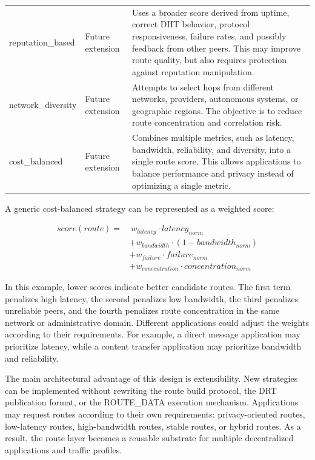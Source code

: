 \documentclass[12pt,a4paper]{article}
\newcommand{\codebreak}[1]{{\footnotesize\ttfamily #1}}
\begin{document}
\begin{table}[H]
\begin{tabularx}{\textwidth}{L{0.22\textwidth} L{0.18\textwidth} Y}
\codebreak{reputation\_\allowbreak{}based} &
Future extension &
Uses a broader score derived from uptime, correct DHT behavior, protocol responsiveness, failure rates, and possibly feedback from other peers. This may improve route quality, but also requires protection against reputation manipulation. \\

\codebreak{network\_\allowbreak{}diversity} &
Future extension &
Attempts to select hops from different networks, providers, autonomous systems, or geographic regions. The objective is to reduce route concentration and correlation risk. \\

\codebreak{cost\_\allowbreak{}balanced} &
Future extension &
Combines multiple metrics, such as latency, bandwidth, reliability, and diversity, into a single route score. This allows applications to balance performance and privacy instead of optimizing a single metric. \\

\bottomrule
\end{tabularx}
\end{table}

A generic cost-balanced strategy can be represented as a weighted score:

\begin{equation}
\begin{aligned}
score(route) =
&\ w_{latency} \cdot latency_{norm} \\
&+ w_{bandwidth} \cdot (1 - bandwidth_{norm}) \\
&+ w_{failure} \cdot failure_{norm} \\
&+ w_{concentration} \cdot concentration_{norm}
\end{aligned}
\end{equation}

In this example, lower scores indicate better candidate routes. The first term penalizes high latency, the second penalizes low bandwidth, the third penalizes unreliable peers, and the fourth penalizes route concentration in the same network or administrative domain. Different applications could adjust the weights according to their requirements. For example, a direct message application may prioritize latency, while a content transfer application may prioritize bandwidth and reliability.

The main architectural advantage of this design is extensibility. New strategies can be implemented without rewriting the route build protocol, the DRT publication format, or the \codebreak{ROUTE\_\allowbreak{}DATA} execution mechanism. Applications may request routes according to their own requirements: privacy-oriented routes, low-latency routes, high-bandwidth routes, stable routes, or hybrid routes. As a result, the route layer becomes a reusable substrate for multiple decentralized applications and traffic profiles.
\end{document}
